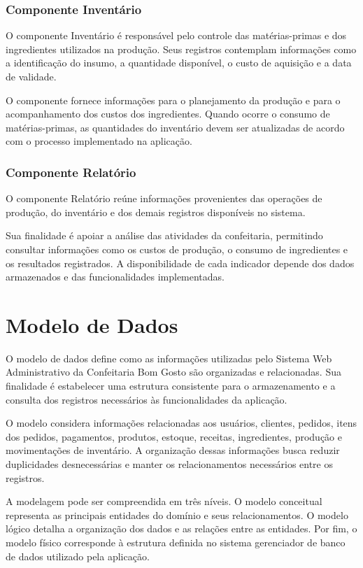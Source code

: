 \subsubsection{Componente Inventário}

O componente Inventário é responsável pelo controle das matérias-primas e dos ingredientes utilizados na produção. Seus registros contemplam informações como a identificação do insumo, a quantidade disponível, o custo de aquisição e a data de validade.

O componente fornece informações para o planejamento da produção e para o acompanhamento dos custos dos ingredientes. Quando ocorre o consumo de matérias-primas, as quantidades do inventário devem ser atualizadas de acordo com o processo implementado na aplicação.

\subsubsection{Componente Relatório}

O componente Relatório reúne informações provenientes das operações de produção, do inventário e dos demais registros disponíveis no sistema.

Sua finalidade é apoiar a análise das atividades da confeitaria, permitindo consultar informações como os custos de produção, o consumo de ingredientes e os resultados registrados. A disponibilidade de cada indicador depende dos dados armazenados e das funcionalidades implementadas.

\section{Modelo de Dados}

O modelo de dados define como as informações utilizadas pelo Sistema Web Administrativo da Confeitaria Bom Gosto são organizadas e relacionadas. Sua finalidade é estabelecer uma estrutura consistente para o armazenamento e a consulta dos registros necessários às funcionalidades da aplicação.

O modelo considera informações relacionadas aos usuários, clientes, pedidos, itens dos pedidos, pagamentos, produtos, estoque, receitas, ingredientes, produção e movimentações de inventário. A organização dessas informações busca reduzir duplicidades desnecessárias e manter os relacionamentos necessários entre os registros.

A modelagem pode ser compreendida em três níveis. O modelo conceitual representa as principais entidades do domínio e seus relacionamentos. O modelo lógico detalha a organização dos dados e as relações entre as entidades. Por fim, o modelo físico corresponde à estrutura definida no sistema gerenciador de banco de dados utilizado pela aplicação.

